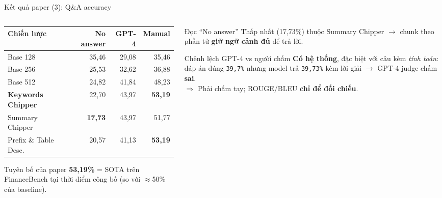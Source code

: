 \documentclass[aspectratio=169,11pt]{beamer}
\begin{document}
\begin{frame}{Kết quả paper (3): Q\&A accuracy}
  \begin{columns}[T]
    \begin{column}{0.54\textwidth}
      \centering\footnotesize
      \begin{tabular}{@{}lrrr@{}}
        \toprule
        \textbf{Chiến lược} & \textbf{No answer} & \textbf{GPT-4} & \textbf{Manual} \\
        \midrule
        Base 128 & 35,46 & 29,08 & 35,46 \\
        Base 256 & 25,53 & 32,62 & 36,88 \\
        Base 512 & 24,82 & 41,84 & 48,23 \\
        \textbf{Keywords Chipper} & 22,70 & 43,97 & \textbf{53,19} \\
        Summary Chipper & \textbf{17,73} & 43,97 & 51,77 \\
        Prefix \& Table Desc. & 20,57 & 41,13 & \textbf{53,19} \\
        \bottomrule
      \end{tabular}
      \vspace{0.3em}
      \begin{block}{\small Tuyên bố của paper}
        \textbf{53,19\%} = SOTA trên FinanceBench tại thời điểm công bố
        (so với $\approx$50\% của baseline).
      \end{block}
    \end{column}
    \begin{column}{0.44\textwidth}
      \begin{alertblock}{\small Đọc ``No answer''}
        Thấp nhất (17,73\%) thuộc Summary Chipper $\rightarrow$ chunk theo phần tử
        \textbf{giữ ngữ cảnh đủ} để trả lời.
      \end{alertblock}
      \begin{alertblock}{\small Chênh lệch GPT-4 vs người chấm}
        \textbf{Có hệ thống}, đặc biệt với câu kèm \emph{tính toán}: đáp án đúng
        \texttt{39,7\%} nhưng model trả \texttt{39,73\%} kèm lời giải
        $\rightarrow$ GPT-4 judge chấm \textbf{sai}.\\
        $\Rightarrow$ Phải chấm tay; ROUGE/BLEU \textbf{chỉ để đối chiếu}.
      \end{alertblock}
    \end{column}
  \end{columns}
\end{frame}
\end{document}
